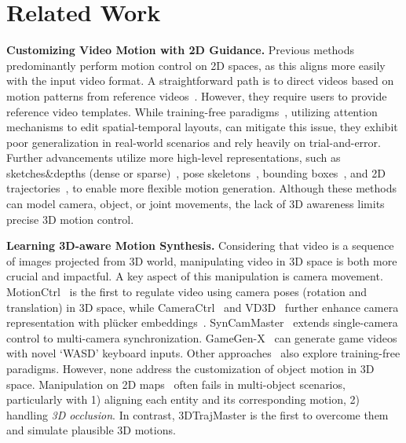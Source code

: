 \section{Related Work}


\noindent \textbf{Customizing Video Motion with 2D Guidance.} Previous methods predominantly perform motion control on 2D spaces, as this aligns more easily with the input video format. A straightforward path is to direct videos based on motion patterns from reference videos~\citep{zhao2023motiondirector,jeong2024vmc,ling2024motionclone}. However, they require users to provide reference video templates.
While training-free paradigms~\citep{yang2024direct,xiao2024video}, utilizing attention mechanisms to edit spatial-temporal layouts, can mitigate this issue, they exhibit poor generalization in real-world scenarios and rely heavily on trial-and-error. Further advancements utilize more high-level representations, such as sketches\&depths (dense or sparse)~\citep{wang2024videocomposer,guo2023sparsectrl}, pose skeletons~\citep{feng2023dreamoving,xu2024magicanimate,chen2024dreamcinema}, bounding boxes~\citep{wang2024boximator}, and 2D trajectories~\citep{wang2024motionctrl,zhang2024tora,yin2023dragnuwa,yang2024direct}, to enable more flexible motion generation. Although these methods can model camera, object, or joint movements, the lack of 3D awareness limits precise 3D motion control.

\noindent \textbf{Learning 3D-aware Motion Synthesis.} Considering that video is a sequence of images projected from 3D world, manipulating video in 3D space is both more crucial and impactful. A key aspect of this manipulation is camera movement. MotionCtrl~\citep{wang2024motionctrl} is the first to regulate video using camera poses (rotation and translation) in 3D space, while CameraCtrl~\citep{he2024cameractrl} and VD3D~\citep{bahmani2024vd3d} further enhance camera representation with plücker embeddings~\citep{sitzmann2021light}. SynCamMaster~\citep{bai2024syncammaster} extends single-camera control to multi-camera synchronization. GameGen-X~\citep{che2024gamegen} can generate game videos with novel `WASD' keyboard inputs. Other approaches~\citep{hou2024training, hu2024motionmaster} also explore training-free paradigms. However, none address the customization of object motion in 3D space. Manipulation on 2D maps~\citep{wang2024motionctrl,zhang2024tora} often fails in multi-object scenarios, particularly with 1) aligning each entity and its corresponding motion, 2) handling \textit{3D occlusion}. In contrast, 3DTrajMaster is the first to overcome them and simulate plausible 3D motions.

